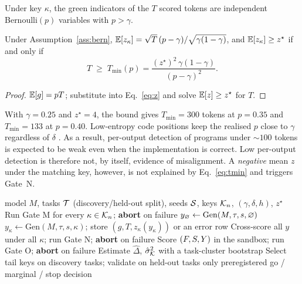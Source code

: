 \begin{assumption}\label{ass:bern}
Under key $\kappa$, the green indicators of the $T$ scored tokens are independent Bernoulli$(p)$ variables with $p>\gamma$.
\end{assumption}

\begin{proposition}\label{prop:length}
Under Assumption~\ref{ass:bern}, $\mathbb{E}[z_\kappa]=\sqrt{T}\,(p-\gamma)/\sqrt{\gamma(1-\gamma)}$, and $\mathbb{E}[z_\kappa]\ge z^\star$ if and only if
\begin{equation}
T\;\ge\;T_{\min}(p)=\frac{(z^\star)^2\,\gamma(1-\gamma)}{(p-\gamma)^2}.
\label{eq:tmin}
\end{equation}
\end{proposition}
\begin{proof}
$\mathbb{E}[g]=pT$; substitute into Eq.~\eqref{eq:z} and solve $\mathbb{E}[z]\ge z^\star$ for $T$.
\end{proof}

With $\gamma=0.25$ and $z^\star=4$, the bound gives $T_{\min}=300$ tokens at $p=0.35$ and $T_{\min}=133$ at $p=0.40$. Low-entropy code positions keep the realised $p$ close to $\gamma$ regardless of $\delta$ \citep{lee2024sweet}. As a result, per-output detection of programs under ${\sim}100$ tokens is expected to be weak even when the implementation is correct. Low per-output detection is therefore not, by itself, evidence of misalignment. A \emph{negative} mean $z$ under the matching key, however, is not explained by Eq.~\eqref{eq:tmin} and triggers Gate~N.

\begin{algorithm}[t]
\caption{Paired KGW key audit}
\label{alg:audit}
\begin{algorithmic}[1]
\REQUIRE model $M$, tasks $\mathcal{T}$ (discovery/held-out split), seeds $\mathcal{S}$, keys $\mathcal{K}_n$, $(\gamma,\delta,h)$, $z^\star$
\STATE Run Gate M for every $\kappa\in\mathcal{K}_n$; \textbf{abort} on failure
  \STATE $y_\varnothing\leftarrow\mathrm{Gen}(M,\tau,s,\varnothing)$
    \STATE $y_\kappa\leftarrow\mathrm{Gen}(M,\tau,s,\kappa)$; store $(g,T,z_\kappa(y_\kappa))$ or an error row
  \ENDFOR
\ENDFOR
\STATE Cross-score all $y$ under all $\kappa$; run Gate N; \textbf{abort} on failure
\STATE Score $(F,S,Y)$ in the sandbox; run Gate O; \textbf{abort} on failure
\STATE Estimate $\hat\Delta$, $\hat\sigma^2_{\mathcal{K}}$ with a task-cluster bootstrap
\STATE Select tail keys on discovery tasks; validate on held-out tasks only
\RETURN preregistered go / marginal / stop decision
\end{algorithmic}
\end{algorithm}

